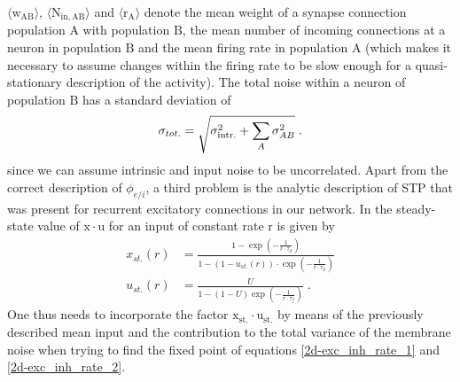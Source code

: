 \documentclass[10pt,a4paper]{article}
\begin{document}
$\mathrm{\langle w_{AB} \rangle,\, \langle N_{\mathrm{in},AB} \rangle}$ and $\mathrm{\langle r_A \rangle}$ denote the mean weight of a synapse connection population $\mathrm{A}$ with population $\mathrm{B}$, the mean number of incoming connections at a neuron in population $\mathrm{B}$ and the mean firing rate in population $\mathrm{A}$ (which makes it necessary to assume changes within the firing rate to be slow enough for a quasi-stationary description of the activity).
The total noise within a neuron of population $\mathrm{B}$ has a standard deviation of 
\begin{equation}
\sigma_{tot.} = \sqrt{\sigma_{\rm intr.}^2 + \sum_A \sigma_{AB}^2} \; .
\label{Total_Noise_Neuron}
\end{equation}
since we can assume intrinsic and input noise to be uncorrelated. Apart from the correct description of $\phi_{e/i}$, a third problem is the analytic description of STP that was present for recurrent excitatory connections in our network. In \cite{Markram_STP} the steady-state value of $\mathrm{x\cdot u}$ for an input of constant rate $\mathrm{r}$ is given by
\begin{align}
x_{st.}(r) &= \frac{1-\exp \left(-\frac{1}{r\cdot \tau _d}\right)}{1-\left(1-u_{st.}\left(r\right)\right)\cdot \exp \left(-\frac{1}{r\cdot \tau _d}\right)} \label{STP_steady1} \\
u_{st.}(r) &= \frac{U}{1-\left(1-U\right)\exp \left(-\frac{1}{r\cdot \tau _f}\right)} \; .\label{STP_steady2}
\end{align}
One thus needs to incorporate the factor $\mathrm{x_{st.}\cdot u_{st.}}$ by means of the previously described mean input and the contribution to the total variance of the membrane noise when trying to find the fixed point of equations \ref{2d-exc_inh_rate_1} and \ref{2d-exc_inh_rate_2}.
 
\end{document}
